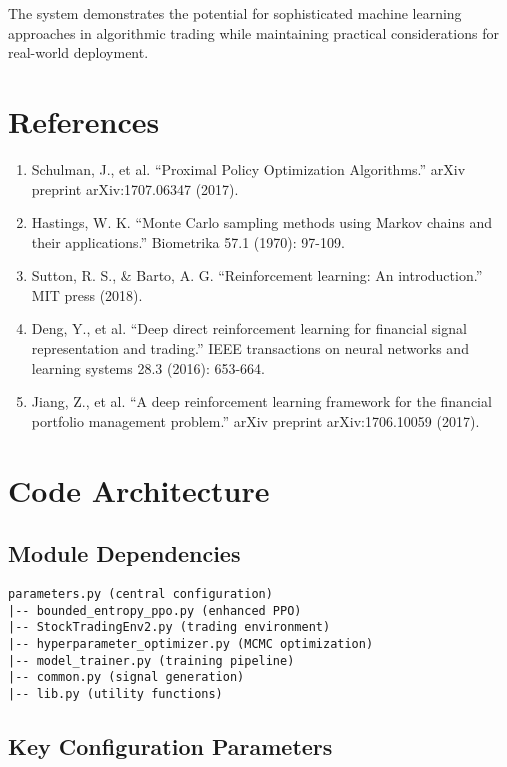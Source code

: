 \documentclass[11pt,a4paper]{article}
\begin{document}
The system demonstrates the potential for sophisticated machine learning approaches in algorithmic trading while maintaining practical considerations for real-world deployment.

\section{References}

\begin{enumerate}
    \item Schulman, J., et al. ``Proximal Policy Optimization Algorithms.'' arXiv preprint arXiv:1707.06347 (2017).
    \item Hastings, W. K. ``Monte Carlo sampling methods using Markov chains and their applications.'' Biometrika 57.1 (1970): 97-109.
    \item Sutton, R. S., \& Barto, A. G. ``Reinforcement learning: An introduction.'' MIT press (2018).
    \item Deng, Y., et al. ``Deep direct reinforcement learning for financial signal representation and trading.'' IEEE transactions on neural networks and learning systems 28.3 (2016): 653-664.
    \item Jiang, Z., et al. ``A deep reinforcement learning framework for the financial portfolio management problem.'' arXiv preprint arXiv:1706.10059 (2017).
\end{enumerate}

\appendix

\section{Code Architecture}

\subsection{Module Dependencies}

\begin{lstlisting}
parameters.py (central configuration)
|-- bounded_entropy_ppo.py (enhanced PPO)
|-- StockTradingEnv2.py (trading environment)
|-- hyperparameter_optimizer.py (MCMC optimization)
|-- model_trainer.py (training pipeline)
|-- common.py (signal generation)
|-- lib.py (utility functions)
\end{lstlisting}

\subsection{Key Configuration Parameters}
\end{document}
